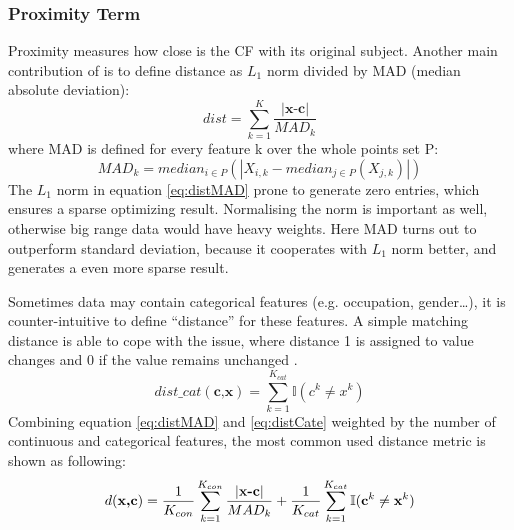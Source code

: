 \subsubsection{Proximity Term} Proximity measures how close is the CF with its original subject. Another main contribution of \cite{watcher2017} is to define distance as \emph{$L_1$} norm divided by MAD (median absolute deviation):
\begin{equation}\label{eq:distMAD}
  dist = \sum_{k=1}^{K}\frac{|\textbf{x-c}|}{MAD_k}
\end{equation}
where MAD is defined for every feature k over the whole points set P:
\begin{equation}\label{eq:MAD}
  MAD_k=median_{i\in P}(|{X_{i,k}}-median_{j\in P}(X_{j,k})|)
\end{equation}
The \emph{$L_1$} norm in equation \ref{eq:distMAD} prone to generate zero entries, which ensures a sparse optimizing result. Normalising the norm is important as well, otherwise big range data would have heavy weights. Here MAD turns out to outperform standard deviation, because it cooperates with \emph{$L_1$} norm better, and generates a even more sparse result.

Sometimes data may contain categorical features (e.g. occupation, gender\dots), it is counter-intuitive to define ``distance'' for these features. A simple matching distance is able to cope with the issue, where distance 1 is assigned to value changes and 0 if the value remains unchanged \cite{DiCE}.
\begin{equation}\label{eq:distCate}
  dist\_cat(\textbf{c,x})=\sum_{k=1}^{K_{cat}}\mathbb{I}(c^k\neq x^k)
\end{equation}
Combining equation \ref{eq:distMAD} and \ref{eq:distCate} weighted by the number of continuous and categorical features, the most common used distance metric is shown as following:
\begin{equation}\label{eq:distCombined}
  d(\textbf{x,c})=\frac{1}{K_{con}}\sum_{k=1}^{K_{con}}\frac{|\textbf{x-c}|}{MAD_k}
  +\frac{1}{K_{cat}}\sum_{k=1}^{K_{cat}}\mathbb{I}(\textbf c^k
  \neq \textbf x^k)
\end{equation}

